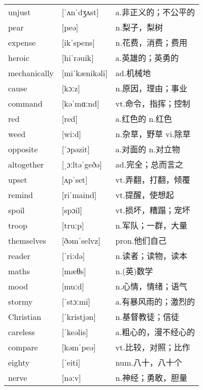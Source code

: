 \documentclass[a4paper]{article}
\begin{document}
\section{}
\begin{tabular}{l l l}

unjust & [ˈʌnˈdʒʌst] & a.非正义的；不公平的 \\
pear & [peə] & n.梨子，梨树 \\
expense & [ikˈspens] & n.花费，消费；费用 \\
heroic & [hiˈrəuik] & a.英雄的；英勇的 \\
mechanically & [miˈkænikəli] & ad.机械地 \\
cause & [kɔːz] & n.原因，理由；事业 \\
command & [kəˈmɑːnd] & vt.命令，指挥；控制 \\
red & [red] & a.红色的 n.红色 \\
weed & [wiːd] & n.杂草，野草 vi.除草 \\
opposite & [ˈɔpəzit] & a.对面的 n.对立物 \\
altogether & [ˌɔːltəˈgeðə] & ad.完全；总而言之 \\
upset & [ʌpˈset] & vt.弄翻，打翻，倾覆 \\
remind & [riˈmaind] & vt.提醒，使想起 \\
spoil & [spɔil] & vt.损坏，糟蹋；宠坏 \\
troop & [truːp] & n.军队；一群，大量 \\
themselves & [ðəmˈselvz] & pron.他们自己 \\
reader & [ˈriːdə] & n.读者；读物，读本 \\
maths & [mæθs] & n.(英)数学 \\
mood & [muːd] & n.心情，情绪；语气 \\
stormy & [ˈstɔːmi] & a.有暴风雨的；激烈的 \\
Christian & [ˈkristjən] & n.基督教徒；信徒 \\
careless & [ˈkeəlis] & a.粗心的，漫不经心的 \\
compare & [kəmˈpeə] & vt.比较，对照；比作 \\
eighty & [ˈeiti] & num.八十，八十个 \\
nerve & [nəːv] & n.神经；勇敢，胆量 \\

\end{tabular}
\end{document}
